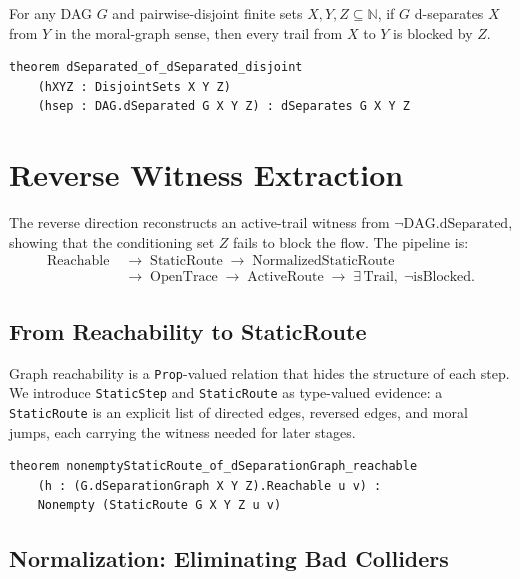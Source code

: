 \documentclass[acmsmall,screen,review,anonymous,nonacm]{acmart}
\newcommand{\lean}[1]{\lstinline!#1!}
\newcommand{\N}{\mathbb{N}}
\begin{document}
\begin{theorem}[Soundness]\label{thm:soundness}
For any DAG $G$ and pairwise-disjoint finite sets $X, Y, Z \subseteq \N$,
if $G$ d-separates $X$ from $Y$ in the moral-graph sense, then every trail
from $X$ to $Y$ is blocked by $Z$.
\end{theorem}

\begin{lstlisting}[caption={Top-level soundness theorem}]
theorem dSeparated_of_dSeparated_disjoint
    (hXYZ : DisjointSets X Y Z)
    (hsep : DAG.dSeparated G X Y Z) : dSeparates G X Y Z
\end{lstlisting}

\section{Reverse Witness Extraction}\label{sec:reverse}

The reverse direction reconstructs an active-trail witness from
$\neg\text{DAG.dSeparated}$, showing that the conditioning set $Z$ fails to
block the flow.
The pipeline is:
\[
\begin{aligned}
\text{Reachable}
&\;\to\; \text{StaticRoute}
\;\to\; \text{NormalizedStaticRoute} \\
&\;\to\; \text{OpenTrace}
\;\to\; \text{ActiveRoute}
\;\to\; \exists\,\text{Trail},\;\neg\text{isBlocked}.
\end{aligned}
\]

\subsection{From Reachability to StaticRoute}

Graph reachability is a \lean{Prop}-valued relation that hides the structure of
each step.  We introduce \lean{StaticStep} and \lean{StaticRoute} as type-valued
evidence: a \lean{StaticRoute} is an explicit list of directed edges, reversed
edges, and moral jumps, each carrying the witness needed for later stages.

\begin{lstlisting}[caption={Reachability to static route}]
theorem nonemptyStaticRoute_of_dSeparationGraph_reachable
    (h : (G.dSeparationGraph X Y Z).Reachable u v) :
    Nonempty (StaticRoute G X Y Z u v)
\end{lstlisting}

\subsection{Normalization: Eliminating Bad Colliders}
\end{document}
